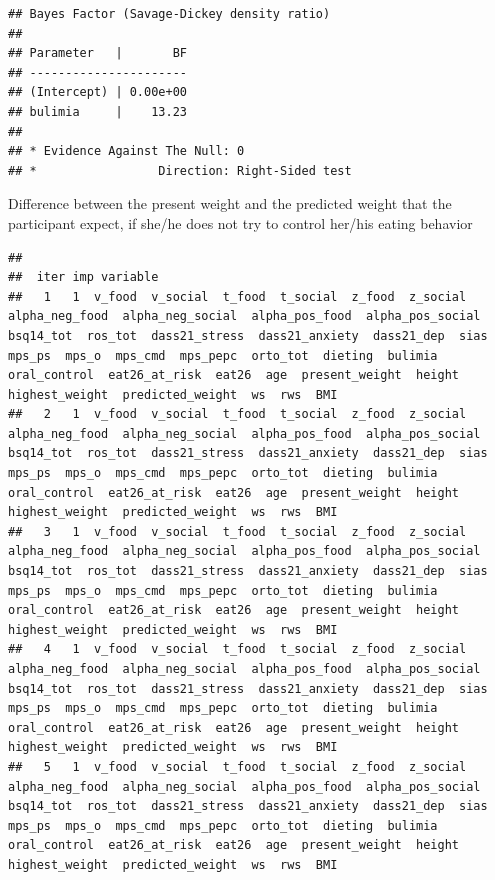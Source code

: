 \documentclass[
]{article}
\newenvironment{Shaded}{\begin{snugshade}}{\end{snugshade}}
\newcommand{\AttributeTok}[1]{\textcolor[rgb]{0.77,0.63,0.00}{#1}}
\newcommand{\CommentTok}[1]{\textcolor[rgb]{0.56,0.35,0.01}{\textit{#1}}}
\newcommand{\DecValTok}[1]{\textcolor[rgb]{0.00,0.00,0.81}{#1}}
\newcommand{\FunctionTok}[1]{\textcolor[rgb]{0.00,0.00,0.00}{#1}}
\newcommand{\NormalTok}[1]{#1}
\newcommand{\OtherTok}[1]{\textcolor[rgb]{0.56,0.35,0.01}{#1}}
\newcommand{\SpecialCharTok}[1]{\textcolor[rgb]{0.00,0.00,0.00}{#1}}
\newcommand{\StringTok}[1]{\textcolor[rgb]{0.31,0.60,0.02}{#1}}
\begin{document}
\begin{verbatim}
## Bayes Factor (Savage-Dickey density ratio)
## 
## Parameter   |       BF
## ----------------------
## (Intercept) | 0.00e+00
## bulimia     |    13.23
## 
## * Evidence Against The Null: 0
## *                 Direction: Right-Sided test
\end{verbatim}

Difference between the present weight and the predicted weight that the
participant expect, if she/he does not try to control her/his eating
behavior

\begin{Shaded}
\end{Shaded}

\begin{verbatim}
## 
##  iter imp variable
##   1   1  v_food  v_social  t_food  t_social  z_food  z_social  alpha_neg_food  alpha_neg_social  alpha_pos_food  alpha_pos_social  bsq14_tot  ros_tot  dass21_stress  dass21_anxiety  dass21_dep  sias  mps_ps  mps_o  mps_cmd  mps_pepc  orto_tot  dieting  bulimia  oral_control  eat26_at_risk  eat26  age  present_weight  height  highest_weight  predicted_weight  ws  rws  BMI
##   2   1  v_food  v_social  t_food  t_social  z_food  z_social  alpha_neg_food  alpha_neg_social  alpha_pos_food  alpha_pos_social  bsq14_tot  ros_tot  dass21_stress  dass21_anxiety  dass21_dep  sias  mps_ps  mps_o  mps_cmd  mps_pepc  orto_tot  dieting  bulimia  oral_control  eat26_at_risk  eat26  age  present_weight  height  highest_weight  predicted_weight  ws  rws  BMI
##   3   1  v_food  v_social  t_food  t_social  z_food  z_social  alpha_neg_food  alpha_neg_social  alpha_pos_food  alpha_pos_social  bsq14_tot  ros_tot  dass21_stress  dass21_anxiety  dass21_dep  sias  mps_ps  mps_o  mps_cmd  mps_pepc  orto_tot  dieting  bulimia  oral_control  eat26_at_risk  eat26  age  present_weight  height  highest_weight  predicted_weight  ws  rws  BMI
##   4   1  v_food  v_social  t_food  t_social  z_food  z_social  alpha_neg_food  alpha_neg_social  alpha_pos_food  alpha_pos_social  bsq14_tot  ros_tot  dass21_stress  dass21_anxiety  dass21_dep  sias  mps_ps  mps_o  mps_cmd  mps_pepc  orto_tot  dieting  bulimia  oral_control  eat26_at_risk  eat26  age  present_weight  height  highest_weight  predicted_weight  ws  rws  BMI
##   5   1  v_food  v_social  t_food  t_social  z_food  z_social  alpha_neg_food  alpha_neg_social  alpha_pos_food  alpha_pos_social  bsq14_tot  ros_tot  dass21_stress  dass21_anxiety  dass21_dep  sias  mps_ps  mps_o  mps_cmd  mps_pepc  orto_tot  dieting  bulimia  oral_control  eat26_at_risk  eat26  age  present_weight  height  highest_weight  predicted_weight  ws  rws  BMI
\end{verbatim}
\end{document}
